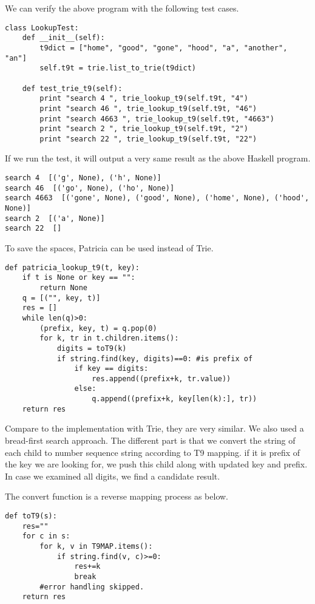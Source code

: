 \documentclass{article}
\begin{document}
We can verify the above program with the following test cases.

\begin{lstlisting}
class LookupTest:
    def __init__(self):
        t9dict = ["home", "good", "gone", "hood", "a", "another", "an"]
        self.t9t = trie.list_to_trie(t9dict)

    def test_trie_t9(self):
        print "search 4 ", trie_lookup_t9(self.t9t, "4")
        print "search 46 ", trie_lookup_t9(self.t9t, "46")
        print "search 4663 ", trie_lookup_t9(self.t9t, "4663")
        print "search 2 ", trie_lookup_t9(self.t9t, "2")
        print "search 22 ", trie_lookup_t9(self.t9t, "22")
\end{lstlisting}

If we run the test, it will output a very same result as the above Haskell
program.

\begin{verbatim}
search 4  [('g', None), ('h', None)]
search 46  [('go', None), ('ho', None)]
search 4663  [('gone', None), ('good', None), ('home', None), ('hood', None)]
search 2  [('a', None)]
search 22  []
\end{verbatim}

To save the spaces, Patricia can be used instead of Trie.

\begin{lstlisting}
def patricia_lookup_t9(t, key):
    if t is None or key == "":
        return None
    q = [("", key, t)]
    res = []
    while len(q)>0:
        (prefix, key, t) = q.pop(0)
        for k, tr in t.children.items():
            digits = toT9(k)
            if string.find(key, digits)==0: #is prefix of
                if key == digits:
                    res.append((prefix+k, tr.value))
                else:
                    q.append((prefix+k, key[len(k):], tr))
    return res
\end{lstlisting}

Compare to the implementation with Trie, they are very similar. We also 
used a bread-first search approach. The different part is that we convert
the string of each child to number sequence string according to T9 mapping.
if it is prefix of the key we are looking for, we push this child along with
updated key and prefix. In case we examined all digits, we find a candidate
result.

The convert function is a reverse mapping process as below.
\begin{lstlisting}
def toT9(s):
    res=""
    for c in s:
        for k, v in T9MAP.items():
            if string.find(v, c)>=0:
                res+=k
                break
        #error handling skipped.
    return res
\end{lstlisting}
\end{document}
